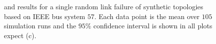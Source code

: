 \begin{figure}[t]
\begin{center}
  \end{center} 
	\caption{\post and \pre results for a single random link failure of synthetic topologies based on IEEE bus system $57$. 
	Each data point is the mean over $105$ simulation runs and the $95\%$ confidence interval is shown in all plots expect (c).} %
  \label{fig:msgs-preinstall57}
\end{figure}


